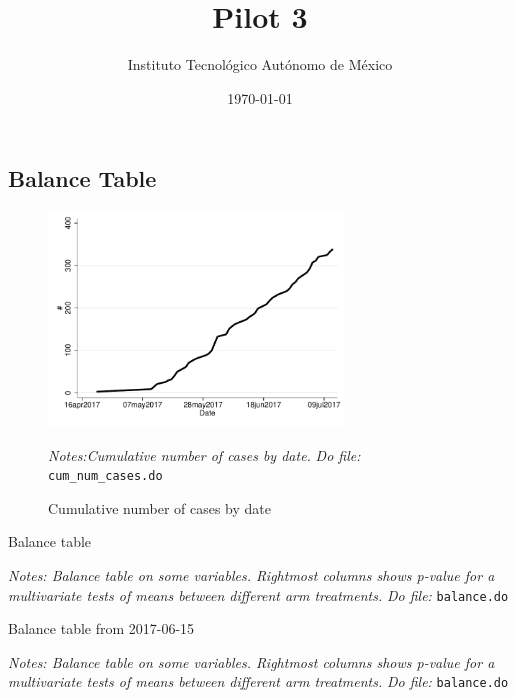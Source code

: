 \documentclass[12pt]{article}
\begin{document}
\title{Pilot 3}

\author{Instituto Tecnológico Autónomo de México}
\date{\today}
\maketitle


\hrulefill




\subsection*{Balance Table}

\begin{figure}[H]
    \caption{Cumulative number of cases by date}
    \begin{center}
        \includegraphics[width=0.7\textwidth]{cum_num_cases.pdf}
        \end{center}
    {\footnotesize \textit{Notes:Cumulative number of cases by date.}}
    {\footnotesize \textit{Do file: } \texttt{cum\_num\_cases.do}}
\end{figure}



\begin{table}[H]
\caption{Balance table}
\begin{center}
\scriptsize{}
\end{center}
 \footnotesize
\textit{Notes: Balance table on some variables. Rightmost columns shows p-value for a multivariate tests of means between different arm treatments.} 
\textit{Do file: } \texttt{balance.do}
\end{table}


\begin{table}[H]
\caption{Balance table from 2017-06-15}
\begin{center}
\scriptsize{}
\end{center}
 \footnotesize
\textit{Notes: Balance table on some variables. Rightmost columns shows p-value for a multivariate tests of means between different arm treatments.} 
\textit{Do file: } \texttt{balance.do}
\end{table}
\end{document}
